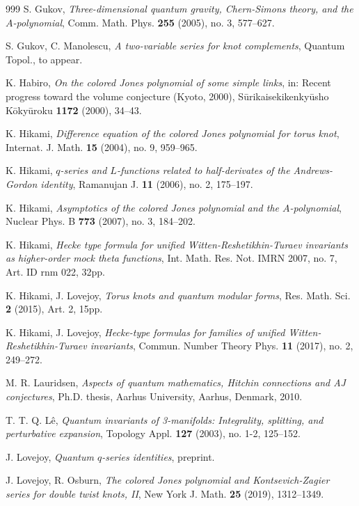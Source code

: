 \documentclass[11pt,reqno]{amsart}
\theoremstyle{definition}
\numberwithin{equation}{section}
\begin{document}
\begin{thebibliography}{999}
S. Gukov, \emph{Three-dimensional quantum gravity, Chern-Simons theory, and the $A$-polynomial}, Comm. Math. Phys. \textbf{255} (2005), no. 3, 577--627.

S. Gukov, C. Manolescu, \emph{A two-variable series for knot complements}, Quantum Topol., to appear.

K. Habiro, \emph{On the colored Jones polynomial of some simple links}, in: Recent progress toward the volume conjecture (Kyoto, 2000), S{\=u}rikaisekikenky{\=u}sho K{\=o}ky{\=u}roku \textbf{1172} (2000), 34--43.

K. Hikami, \emph{Difference equation of the colored Jones polynomial for torus knot}, Internat. J. Math. \textbf{15} (2004), no. 9, 959--965.

K. Hikami, \emph{$q$-series and $L$-functions related to half-derivates of the Andrews-Gordon identity}, Ramanujan J. \textbf{11} (2006), no. 2, 175--197.

K. Hikami, \emph{Asymptotics of the colored Jones polynomial and the $A$-polynomial}, Nuclear Phys. B \textbf{773} (2007), no. 3, 184--202.

K. Hikami, \emph{Hecke type formula for unified Witten-Reshetikhin-Turaev invariants as higher-order mock theta functions}, Int. Math. Res. Not. IMRN 2007, no. 7, Art. ID rnm 022, 32pp.

K. Hikami, J. Lovejoy, \emph{Torus knots and quantum modular forms}, Res. Math. Sci. \textbf{2} (2015), Art. 2, 15pp.  
  
K. Hikami, J. Lovejoy, \emph{Hecke-type formulas for families of unified Witten-Reshetikhin-Turaev invariants}, Commun. Number Theory Phys. \textbf{11} (2017), no. 2, 249--272. 
  
M. R. Lauridsen, \emph{Aspects of quantum mathematics, Hitchin connections and AJ conjectures}, Ph.D. thesis, Aarhus University, Aarhus, Denmark, 2010.  
  
T. T. Q. L{\^e}, \emph{Quantum invariants of 3-manifolds: Integrality, splitting, and perturbative expansion}, Topology Appl. \textbf{127} (2003), no. 1-2, 125--152.
  
J. Lovejoy, \emph{Quantum $q$-series identities}, preprint.  
  
J. Lovejoy, R. Osburn, \emph{The colored Jones polynomial and Kontsevich-Zagier series for double twist knots, II}, New York J. Math. \textbf{25} (2019), 1312--1349.  
  

\end{thebibliography}
\end{document}
